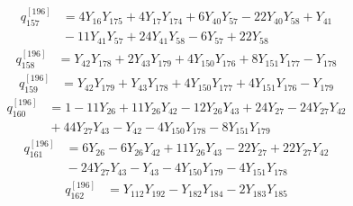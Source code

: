 \begin{equation}\label{q196:row:157}
\begin{aligned}
q_{157}^{[196]} &={} 4Y_{16}Y_{175} + 4Y_{17}Y_{174} + 6Y_{40}Y_{57} - 22Y_{40}Y_{58} + Y_{41}\\
&{} - 11Y_{41}Y_{57} + 24Y_{41}Y_{58} - 6Y_{57} + 22Y_{58}
\end{aligned}
\end{equation}
\begin{equation}\label{q196:row:158}
\begin{aligned}
q_{158}^{[196]} &={} Y_{42}Y_{178} + 2Y_{43}Y_{179} + 4Y_{150}Y_{176} + 8Y_{151}Y_{177} - Y_{178}
\end{aligned}
\end{equation}
\begin{equation}\label{q196:row:159}
\begin{aligned}
q_{159}^{[196]} &={} Y_{42}Y_{179} + Y_{43}Y_{178} + 4Y_{150}Y_{177} + 4Y_{151}Y_{176} - Y_{179}
\end{aligned}
\end{equation}
\begin{equation}\label{q196:row:160}
\begin{aligned}
q_{160}^{[196]} &={} 1 - 11Y_{26} + 11Y_{26}Y_{42} - 12Y_{26}Y_{43} + 24Y_{27} - 24Y_{27}Y_{42}\\
&{} + 44Y_{27}Y_{43} - Y_{42} - 4Y_{150}Y_{178} - 8Y_{151}Y_{179}
\end{aligned}
\end{equation}
\begin{equation}\label{q196:row:161}
\begin{aligned}
q_{161}^{[196]} &={} 6Y_{26} - 6Y_{26}Y_{42} + 11Y_{26}Y_{43} - 22Y_{27} + 22Y_{27}Y_{42}\\
&{} - 24Y_{27}Y_{43} - Y_{43} - 4Y_{150}Y_{179} - 4Y_{151}Y_{178}
\end{aligned}
\end{equation}
\begin{equation}\label{q196:row:162}
\begin{aligned}
q_{162}^{[196]} &={} Y_{112}Y_{192} - Y_{182}Y_{184} - 2Y_{183}Y_{185}
\end{aligned}
\end{equation}
